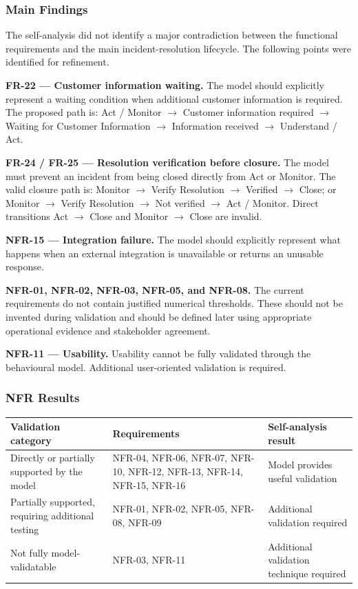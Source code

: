 \documentclass[11pt,a4paper]{article}
\begin{document}
\subsubsection*{Main Findings}

The self-analysis did not identify a major contradiction between the functional requirements and the main incident-resolution lifecycle. The following points were identified for refinement.

\textbf{FR-22 — Customer information waiting.} The model should explicitly represent a waiting condition when additional customer information is required. The proposed path is: Act / Monitor $\rightarrow$ Customer information required $\rightarrow$ Waiting for Customer Information $\rightarrow$ Information received $\rightarrow$ Understand / Act.

\textbf{FR-24 / FR-25 — Resolution verification before closure.} The model must prevent an incident from being closed directly from Act or Monitor. The valid closure path is: Monitor $\rightarrow$ Verify Resolution $\rightarrow$ Verified $\rightarrow$ Close; or Monitor $\rightarrow$ Verify Resolution $\rightarrow$ Not verified $\rightarrow$ Act / Monitor. Direct transitions Act $\rightarrow$ Close and Monitor $\rightarrow$ Close are invalid.

\textbf{NFR-15 — Integration failure.} The model should explicitly represent what happens when an external integration is unavailable or returns an unusable response.

\textbf{NFR-01, NFR-02, NFR-03, NFR-05, and NFR-08.} The current requirements do not contain justified numerical thresholds. These should not be invented during validation and should be defined later using appropriate operational evidence and stakeholder agreement.

\textbf{NFR-11 — Usability.} Usability cannot be fully validated through the behavioural model. Additional user-oriented validation is required.

\subsubsection*{NFR Results}

\begin{center}
\small
\begin{tabularx}{\textwidth}{@{} X l X @{}}
\toprule
\textbf{Validation category} & \textbf{Requirements} & \textbf{Self-analysis result} \\
\midrule
Directly or partially supported by the model & NFR-04, NFR-06, NFR-07, NFR-10, NFR-12, NFR-13, NFR-14, NFR-15, NFR-16 & Model provides useful validation \\
Partially supported, requiring additional testing & NFR-01, NFR-02, NFR-05, NFR-08, NFR-09 & Additional validation required \\
Not fully model-validatable & NFR-03, NFR-11 & Additional validation technique required \\
\bottomrule
\end{tabularx}
\end{center}
\end{document}

